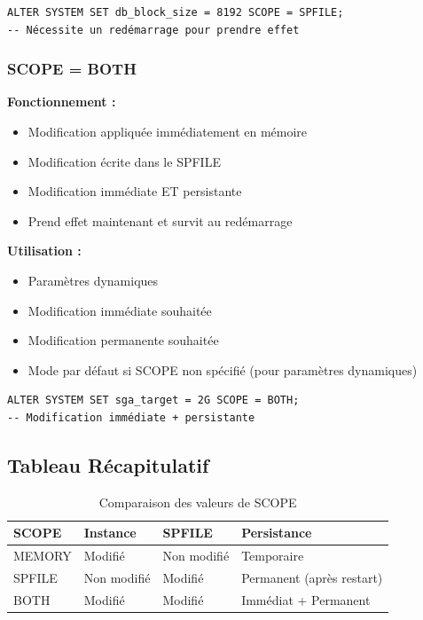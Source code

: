 \documentclass[11pt,a4paper]{article}
\begin{document}
\begin{commandebox}
\begin{lstlisting}
ALTER SYSTEM SET db_block_size = 8192 SCOPE = SPFILE;
-- Nécessite un redémarrage pour prendre effet
\end{lstlisting}
\end{commandebox}

\subsubsection{SCOPE = BOTH}

\textbf{Fonctionnement :}
\begin{itemize}
    \item Modification appliquée immédiatement en mémoire
    \item Modification écrite dans le SPFILE
    \item Modification immédiate ET persistante
    \item Prend effet maintenant et survit au redémarrage
\end{itemize}

\textbf{Utilisation :}
\begin{itemize}
    \item Paramètres dynamiques
    \item Modification immédiate souhaitée
    \item Modification permanente souhaitée
    \item Mode par défaut si SCOPE non spécifié (pour paramètres dynamiques)
\end{itemize}

\begin{commandebox}
\begin{lstlisting}
ALTER SYSTEM SET sga_target = 2G SCOPE = BOTH;
-- Modification immédiate + persistante
\end{lstlisting}
\end{commandebox}

\subsection{Tableau Récapitulatif}

\begin{table}[h]
\centering
\begin{tabular}{|l|l|l|l|}
\hline
\textbf{SCOPE} & \textbf{Instance} & \textbf{SPFILE} & \textbf{Persistance} \\
\hline
MEMORY & Modifié & Non modifié & Temporaire \\
SPFILE & Non modifié & Modifié & Permanent (après restart) \\
BOTH & Modifié & Modifié & Immédiat + Permanent \\
\hline
\end{tabular}
\caption{Comparaison des valeurs de SCOPE}
\end{table}
\end{document}
